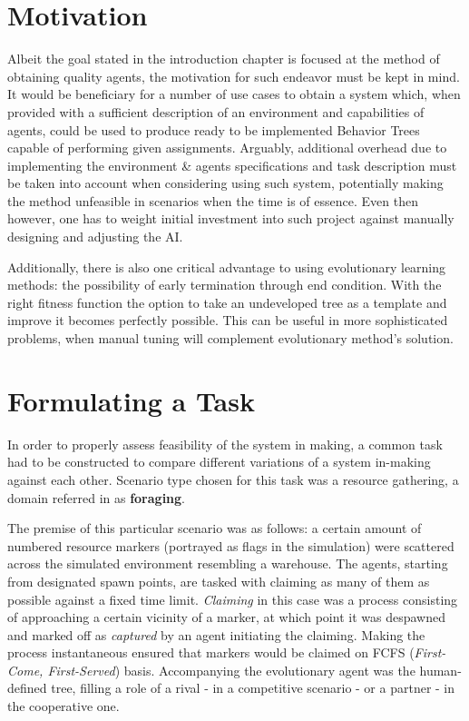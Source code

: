 \section{Motivation}
Albeit the goal stated in the introduction chapter is focused at the method of obtaining quality agents, the motivation for such endeavor must be kept in mind. It would be beneficiary for a number of use cases to obtain a system which, when provided with a sufficient description of an environment and capabilities of agents, could be used to produce ready to be implemented Behavior Trees capable of performing given assignments. Arguably, additional overhead due to implementing the environment \& agents specifications and task description must be taken into account when considering using such system, potentially making the method unfeasible in scenarios when the time is of essence. Even then however, one has to weight initial investment into such project against manually designing and adjusting the AI.

Additionally, there is also one critical advantage to using evolutionary learning methods: the possibility of early termination through end condition. With the right fitness function the option to take an undeveloped tree as a template and improve it becomes perfectly possible. This can be useful in more sophisticated problems, when manual tuning will complement evolutionary method's solution. %
\section{Formulating a Task}
In order to properly assess feasibility of the system in making, a common task had to be constructed to compare different variations of a system in-making against each other. Scenario type chosen for this task was a resource gathering, a domain referred in \cite{cooperationstateoftheart} as \textbf{foraging}.

The premise of this particular scenario was as follows: a certain amount of numbered resource markers (portrayed as flags in the simulation) were scattered across the simulated environment resembling a warehouse. The agents, starting from designated spawn points, are tasked with claiming as many of them as possible against a fixed time limit. \textit{Claiming} in this case was a process consisting of approaching a certain vicinity of a marker, at which point it was despawned and marked off as \textit{captured} by an agent initiating the claiming. Making the process instantaneous ensured that markers would be claimed on FCFS (\textit{First-Come, First-Served}) basis. Accompanying the evolutionary agent was the human-defined tree, filling a role of a rival - in a competitive scenario - or a partner - in the cooperative one.

